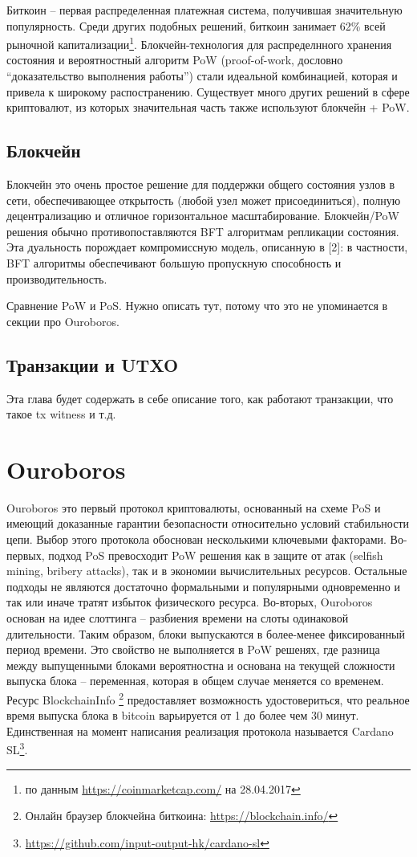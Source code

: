 \documentclass[specification,annotation]{itmo-student-thesis}
\begin{document}
Биткоин -- первая распределенная платежная система, получившая
значительную популярность. Среди других подобных решений, биткоин
занимает 62\% всей рыночной капитализации\footnote{по данным
  \url{https://coinmarketcap.com/} на 28.04.2017}. Блокчейн-технология
для распределнного хранения состояния и вероятностный алгоритм PoW
(proof-of-work, дословно ``доказательство выполнения работы'') стали
идеальной комбинацией, которая и привела к широкому
распостранению. Существует много других решений в сфере криптовалют,
из которых значительная часть также используют блокчейн + PoW.

\subsection{Блокчейн}

Блокчейн это очень простое решение для поддержки общего состояния
узлов в сети, обеспечивающее открытость (любой узел может
присоединиться), полную децентрализацию и отличное горизонтальное
масштабирование. Блокчейн/PoW решения обычно противопоставляются BFT
алгоритмам репликации состояния. Эта дуальность порождает
компромиссную модель, описанную в [2]: в частности, BFT алгоритмы
обеспечивают большую пропускную способность и производительность.

Сравнение PoW и PoS. Нужно описать тут, потому что это не упоминается
в секции про Ouroboros.

\subsection{Транзакции и UTXO}

Эта глава будет содержать в себе описание того, как работают
транзакции, что такое tx witness и т.д.

\section{Ouroboros}

Ouroboros \cite{ouroboros} это первый протокол криптовалюты,
основанный на схеме PoS и имеющий доказанные гарантии безопасности
относительно условий стабильности цепи. Выбор этого протокола
обоснован несколькими ключевыми факторами. Во-первых, подход PoS
превосходит PoW решения как в защите от атак (selfish mining, bribery
attacks), так и в экономии вычислительных ресурсов. Остальные подходы
не являются достаточно формальными и популярными одновременно и так
или иначе тратят избыток физического ресурса. Во-вторых, Ouroboros
основан на идее слоттинга -- разбиения времени на слоты одинаковой
длительности. Таким образом, блоки выпускаются в более-менее
фиксированный период времени. Это свойство не выполняется в PoW
решенях, где разница между выпущенными блоками вероятностна и основана
на текущей сложности выпуска блока -- переменная, которая в общем
случае меняется со временем. Ресурс BlockchainInfo \footnote{Онлайн
  браузер блокчейна биткоина: \url{https://blockchain.info/}}
предоставляет возможность удостовериться, что реальное время выпуска
блока в bitcoin варьируется от 1 до более чем 30 минут. Единственная
на момент написания реализация протокола называется Cardano
SL\footnote{\url{https://github.com/input-output-hk/cardano-sl}}.
\end{document}
